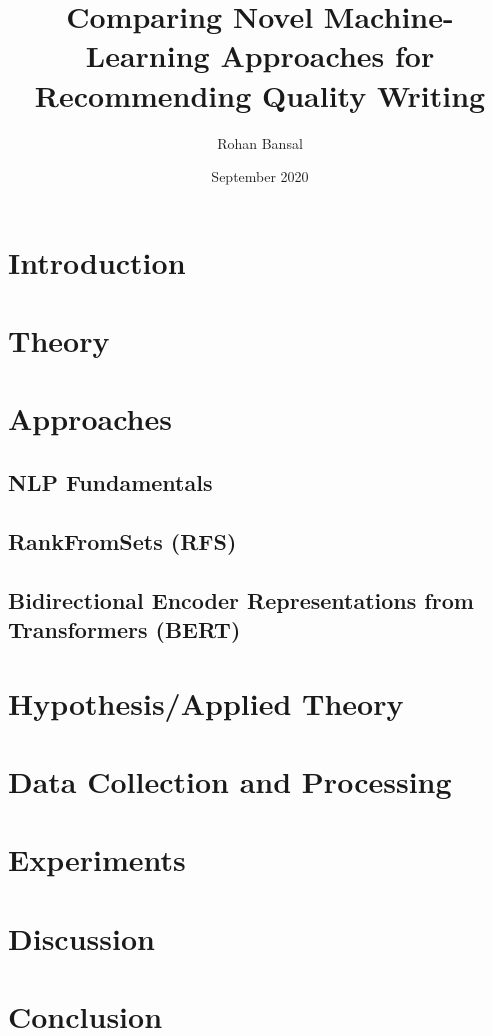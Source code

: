 \documentclass[12pt]{article}
\title{Comparing Novel Machine-Learning Approaches for Recommending Quality Writing}
\author{Rohan Bansal}
\date{September 2020}
\begin{document}


\tableofcontents
\newpage

\section{Introduction}


\section{Theory}


\section{Approaches}

\subsection{NLP Fundamentals}


\subsection{RankFromSets (RFS)}


\subsection{Bidirectional Encoder Representations from Transformers (BERT)}


\section{Hypothesis/Applied Theory}


\section{Data Collection and Processing}


\section{Experiments}


\section{Discussion}


\section{Conclusion}


\printbibliography
\cleardoublepage
\appendix

\end{document}
